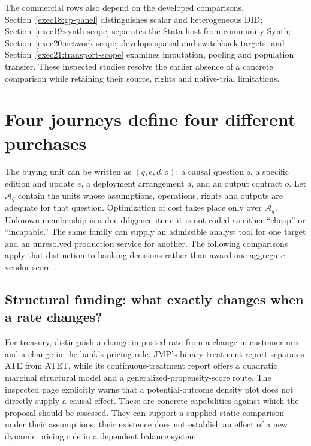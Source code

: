 The commercial rows also depend on the developed comparisons.
Section~\ref{exec18:gp-panel} distinguishes scalar and heterogeneous DID;
Section~\ref{exec19:synth-scope} separates the Stata host from community
Synth; Section~\ref{exec20:network-scope} develops spatial and switchback
targets; and Section~\ref{exec21:transport-scope} examines imputation, pooling
and population transfer. These inspected studies resolve the earlier absence
of a concrete comparison while retaining their source, rights and native-trial
limitations.

\section{Four journeys define four different purchases}
\label{exec17:s8-journeys}

The buying unit can be written as $(q,e,d,o)$: a causal question $q$, a
specific edition and update $e$, a deployment arrangement $d$, and an output
contract $o$. Let $\mathcal A_q$ contain the units whose assumptions, operations,
rights and outputs are adequate for that question. Optimization of cost takes
place only over $\mathcal A_q$. Unknown membership is a due-diligence item;
it is not coded as either ``cheap'' or ``incapable.'' The same family can
supply an admissible analyst tool for one target and an unresolved production
service for another. The following comparisons apply that distinction to
banking decisions rather than award one aggregate vendor score
\citep{exec17_s8_paths}.

\subsection{Structural funding: what exactly changes when a rate changes?}

For treasury, distinguish a change in posted rate from a change in customer
mix and a change in the bank's pricing rule. JMP's binary-treatment report
separates ATE from ATET, while its continuous-treatment report offers a
quadratic marginal structural model and a generalized-propensity-score route.
The inspected page explicitly warns that a potential-outcome density plot
does not directly supply a causal effect. These are concrete capabilities
against which the proposal should be assessed. They can support a supplied
static comparison under their assumptions; their existence does not establish
an effect of a new dynamic pricing rule in a dependent balance system
\citep{exec13_ch_jmp_causal}.

